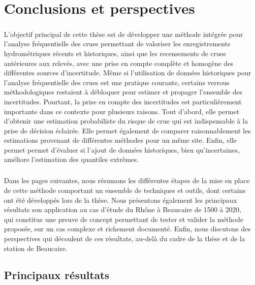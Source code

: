 \chapter{Conclusions et perspectives}
\label{chap:conclu}

\paragraph{} L'objectif principal de cette thèse est de développer une méthode intégrée pour l'analyse fréquentielle des crues permettant de valoriser les enregistrements hydrométriques récents et historiques, ainsi que les recensements de crues antérieures aux relevés, avec une prise en compte complète et homogène des différentes sources d'incertitude. Même si l'utilisation de données historiques pour l'analyse fréquentielle des crues est une pratique courante, certains verrous méthodologiques restaient à débloquer pour estimer et propager l'ensemble des incertitudes. Pourtant, la prise en compte des incertitudes est particulièrement importante dans ce contexte pour plusieurs raisons. Tout d'abord, elle permet d'obtenir une estimation probabiliste du risque de crue qui est indispensable à la prise de décision éclairée. Elle permet également de comparer raisonnablement les estimations provenant de différentes méthodes pour un même site. Enfin, elle permet permet d'évaluer si l'ajout de données historiques, bien qu'incertaines, améliore l'estimation des quantiles extrêmes.

\paragraph{} Dans les pages suivantes, nous résumons les différentes étapes de la mise en place de cette méthode comportant un ensemble de techniques et outils, dont certains ont été développés lors de la thèse. Nous présentons également les principaux résultats son application au cas d'étude du Rhône à Beaucaire de 1500 à 2020, qui constitue une preuve de concept permettant de tester et valider la méthode proposée, sur un cas complexe et richement documenté. Enfin, nous discutons des perspectives qui découlent de ces résultats, au-delà du cadre de la thèse et de la station de Beaucaire. 
	
	
	\section{Principaux résultats}
	
